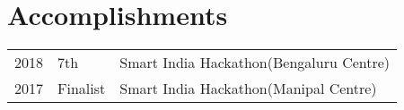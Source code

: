 \documentclass[]{single-page-resume}
\begin{document}
\begin{minipage}[t]{0.66\textwidth}

\section{Accomplishments} 
\begin{tabular}{rll}
2018	    &7th  & Smart India Hackathon(Bengaluru Centre)\\
2017	     & Finalist & Smart India Hackathon(Manipal Centre)
\end{tabular}
\sectionsep

\end{minipage} 
\end{document}
